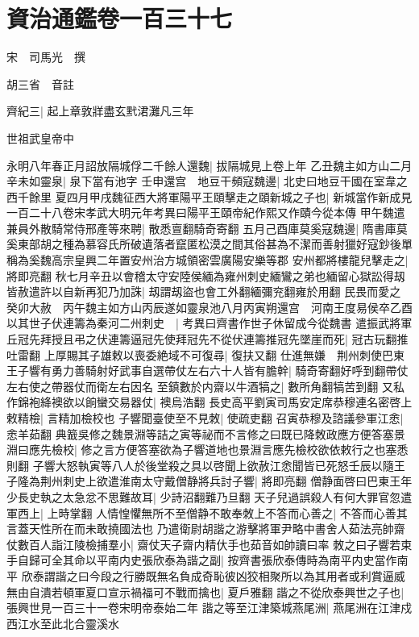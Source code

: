 \chapter{資治通鑑卷一百三十七}
宋　司馬光　撰

胡三省　音註

齊紀三|{
	起上章敦牂盡玄黓涒灘凡三年}


世祖武皇帝中

永明八年春正月詔放隔城俘二千餘人還魏|{
	拔隔城見上卷上年}
乙丑魏主如方山二月辛未如靈泉|{
	泉下當有池字}
壬申還宫　地豆干頻寇魏邊|{
	北史曰地豆干國在室韋之西千餘里}
夏四月甲戌魏征西大將軍陽平王頤擊走之頤新城之子也|{
	新城當作新成見一百二十八卷宋孝武大明元年考異曰陽平王頤帝紀作熙又作賾今從本傳}
甲午魏遣兼員外散騎常侍邢產等來聘|{
	散悉亶翻騎奇寄翻}
五月己酉庫莫奚寇魏邊|{
	隋書庫莫奚東部胡之種為慕容氏所破遺落者竄匿松漠之間其俗甚為不潔而善射獵好寇鈔後單稱為奚魏高宗皇興二年置安州治方城領密雲廣陽安樂等郡}
安州都將樓龍兒擊走之|{
	將即亮翻}
秋七月辛丑以會稽太守安陸侯緬為雍州刺史緬鸞之弟也緬留心獄訟得刼皆赦遣許以自新再犯乃加誅|{
	刼謂刼盜也會工外翻緬彌兖翻雍於用翻}
民畏而愛之　癸卯大赦　丙午魏主如方山丙辰遂如靈泉池八月丙寅朔還宫　河南王度易侯卒乙酉以其世子伏連籌為秦河二州刺史　|{
	考異曰齊書作世子休留成今從魏書}
遣振武將軍丘冠先拜授且弔之伏連籌逼冠先使拜冠先不從伏連籌推冠先墜崖而死|{
	冠古玩翻推吐雷翻}
上厚賜其子雄敕以喪委絶域不可復尋|{
	復扶又翻}
仕進無嫌　荆州刺使巴東王子響有勇力善騎射好武事自選帶仗左右六十人皆有膽幹|{
	騎奇寄翻好呼到翻帶仗左右使之帶器仗而衛左右因名}
至鎮數於内齋以牛酒犒之|{
	數所角翻犒苦到翻}
又私作錦袍絳襖欲以餉蠻交易器仗|{
	襖烏浩翻}
長史高平劉寅司馬安定席恭穆連名密啓上敕精檢|{
	言精加檢校也}
子響聞臺使至不見敇|{
	使疏吏翻}
召寅恭穆及諮議參軍江悆|{
	悆羊茹翻}
典籖吳修之魏景淵等詰之寅等祕而不言修之曰既已降敇政應方便答塞景淵曰應先檢校|{
	修之言方便答塞欲為子響道地也景淵言應先檢校欲依敕行之也塞悉則翻}
子響大怒執寅等八人於後堂殺之具以啓聞上欲赦江悆聞皆已死怒壬辰以隨王子隆為荆州刺史上欲遣淮南太守戴僧静將兵討子響|{
	將即亮翻}
僧静面啓曰巴東王年少長史執之太急忿不思難故耳|{
	少詩沼翻難乃旦翻}
天子兒過誤殺人有何大罪官忽遣軍西上|{
	上時掌翻}
人情惶懼無所不至僧静不敢奉敇上不答而心善之|{
	不答而心善其言蓋天性所在而未敢撓國法也}
乃遣衛尉胡諧之游擊將軍尹略中書舍人茹法亮帥齋仗數百人詣江陵檢捕羣小|{
	齋仗天子齋内精㐲手也茹音如帥讀曰率}
敇之曰子響若束手自歸可全其命以平南内史張欣泰為諧之副|{
	按齊書張欣泰傳時為南平内史當作南平}
欣泰謂諧之曰今段之行勝既無名負成奇恥彼凶狡相聚所以為其用者或利賞逼威無由自潰若頓軍夏口宣示禍福可不戰而擒也|{
	夏戶雅翻}
諧之不從欣泰興世之子也|{
	張興世見一百三十一卷宋明帝泰始二年}
諧之等至江津築城燕尾洲|{
	燕尾洲在江津戍西江水至此北合靈溪水}
